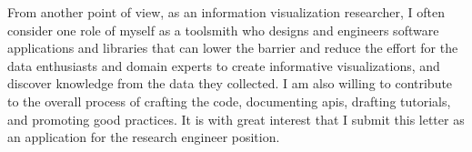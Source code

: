 \documentclass[11pt,a4paper,sans]{moderncv} %
\begin{document}
From another point of view, as an information visualization researcher, I often consider one role of myself as a toolsmith who designs and engineers software applications and libraries that can lower the barrier and reduce the effort for the data enthusiasts and domain experts to create informative visualizations, and discover knowledge from the data they collected. I am also willing to contribute to the overall process of crafting the code, documenting apis, drafting tutorials, and promoting good practices. It is with great interest that I submit this letter as an application for the research engineer position.

\vspace{1.0cm}


\makeletterclosing %
\end{document}
